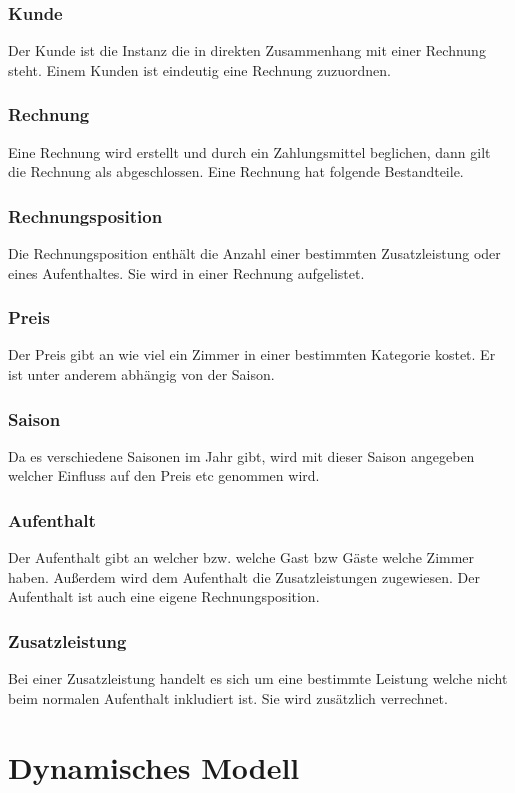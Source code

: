 \documentclass[10pt,a4paper,titlepage]{article}
\begin{document}
\subsubsection{Kunde}
Der Kunde ist die Instanz die in direkten Zusammenhang mit einer Rechnung steht.
Einem Kunden ist eindeutig eine Rechnung zuzuordnen.
\subsubsection{Rechnung}
Eine Rechnung wird erstellt und durch ein Zahlungsmittel beglichen, dann gilt die Rechnung als abgeschlossen. Eine Rechnung hat folgende Bestandteile.
\subsubsection{Rechnungsposition}
Die Rechnungsposition enthält die Anzahl einer bestimmten Zusatzleistung oder
eines Aufenthaltes. Sie wird in einer Rechnung aufgelistet.
\subsubsection{Preis}
Der Preis gibt an wie viel ein Zimmer in einer bestimmten Kategorie kostet. Er
ist unter anderem abhängig von der Saison.
\subsubsection{Saison}
Da es verschiedene Saisonen im Jahr gibt, wird mit dieser Saison angegeben
welcher Einfluss auf den Preis etc genommen wird. 
\subsubsection{Aufenthalt}
Der Aufenthalt gibt an welcher bzw. welche Gast bzw Gäste welche Zimmer haben.
Außerdem wird dem Aufenthalt die Zusatzleistungen zugewiesen. Der Aufenthalt ist
auch eine eigene Rechnungsposition.
\subsubsection{Zusatzleistung}
Bei einer Zusatzleistung handelt es sich um eine bestimmte Leistung welche nicht
beim normalen Aufenthalt inkludiert ist. Sie wird zusätzlich verrechnet.

\newpage

\section{Dynamisches Modell}
\end{document}
